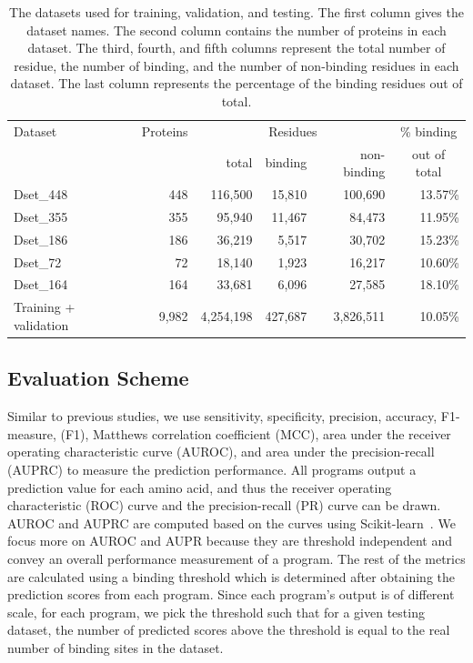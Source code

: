 \begin{table}[htbp]
    \centering
    \caption{The datasets used for training, validation, and testing. The first column gives the dataset names. The second column contains the number of proteins in each dataset. The third, fourth, and fifth columns represent the total number of residue, the number of binding, and the number of non-binding residues in each dataset. The last column represents the percentage of the binding residues out of total.}
    \begin{tabular}{p{12em}rrrrr}
    \toprule
    Dataset & Proteins & \multicolumn{3}{c}{Residues} & \multicolumn{1}{c}{\% binding} \\ \cline{3-5}
    & & total & binding & non-binding & \multicolumn{1}{c}{out of total}\\ \hline
    Dset\_448 & 448   & 116,500 & 15,810 & 100,690 & 13.57\% \\
    Dset\_355 & 355   & 95,940 & 11,467 & 84,473 & 11.95\% \\
    Dset\_186 & 186   & 36,219 & 5,517 & 30,702 & 15.23\% \\
    Dset\_72 & 72    & 18,140 & 1,923 & 16,217 & 10.60\% \\
    Dset\_164 & 164   & 33,681 & 6,096 & 27,585 & 18.10\% \\
    Training + validation & 9,982 & 4,254,198 & 427,687 & 3,826,511 & 10.05\% \\
    \hline
    \end{tabular}%
    \label{tab_dataset}%
\end{table}%
\subsection{Evaluation Scheme}
Similar to previous studies, we use sensitivity, specificity, precision, accuracy, F1-measure, (F1), Matthews correlation coefficient (MCC), area under the receiver operating characteristic curve (AUROC), and area under the precision-recall (AUPRC) to measure the prediction performance. All programs output a prediction value for each amino acid, and thus the receiver operating characteristic (ROC) curve and the precision-recall (PR) curve can be drawn. AUROC and AUPRC are computed based on the curves using Scikit-learn~\cite{scikit-learn}. We focus more on AUROC and AUPR because they are threshold independent and convey an overall performance measurement of a program. The rest of the metrics are calculated using a binding threshold which is determined after obtaining the prediction scores from each program. Since each program's output is of different scale, for each program, we pick the threshold such that for a given testing dataset, the number of predicted scores above the threshold is equal to the real number of binding sites in the dataset. 

